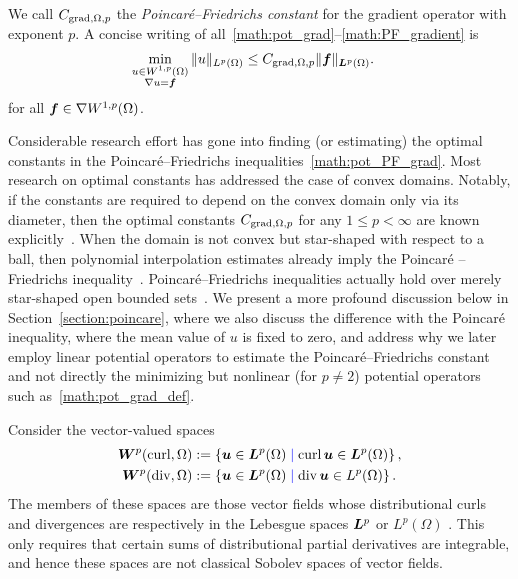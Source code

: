\documentclass[10pt,a4paper]{article}
\newcommand\cye[1]{%
\protect\leavevmode
\begingroup
    \color{blue}%
    #1%
\endgroup
}
\begin{document}
We call $C_{\operatorname{grad},\Omega,p}$ the \emph{Poincar\'e--Friedrichs constant} for the gradient operator with exponent $p$. \cye{A concise writing of all~\eqref{math:pot_grad}--\eqref{math:PF_gradient} is
\begin{align} \label{math:pot_PF_grad}
    \min\limits_{ \substack{ u \in W^{1,p}(\Omega) \\ \nabla u = \bm{f} } } 
    \| u \|_{L^{p}(\Omega)}
    &\leq 
    C_{\operatorname{grad},\Omega,p}
    \| \bm{f} \|_{\bm{L}^{p}(\Omega)}.
\end{align}
for all $\bm{f} \in \nabla W^{1,p}(\Omega)$.}

Considerable research effort has gone into finding (or estimating) the optimal constants in the Poincar\'e--Friedrichs inequalities~\eqref{math:pot_PF_grad}. Most research on optimal constants has addressed the case of convex domains. 
Notably, if the constants are required to depend on the convex domain only via its diameter, 
then the optimal constants $C_{\operatorname{grad},\Omega,p}$ for any $1 \leq p < \infty$ are known explicitly~\cite{Pay_Wei_Poin_conv_60,bebendorf2003note,acosta2004optimal,esposito2013poincare,ferone2012remark}.
When the domain is not convex but star-shaped with respect to a ball,
then polynomial interpolation estimates already imply the Poincar\'e\cye{--Friedrichs} inequality~\cite{brenner2008mathematical,ern2021finite}. 
Poincar\'e--Friedrichs inequalities actually hold over merely star-shaped open bounded sets~\cite[Theorem~3.1]{hurri1988poincare}. 
\cye{We present a more profound discussion below in Section~\ref{section:poincare}, where we also discuss the difference with the Poincar\'e inequality, where the mean value of $u$ is fixed to zero, and address why we later employ linear potential operators to estimate the Poincar\'e--Friedrichs constant and not directly the minimizing but nonlinear (for $p \neq 2$) potential operators such as~\eqref{math:pot_grad_def}.} 


Consider the vector-valued spaces
\begin{subequations}\label{equation:W_curl_div_p} \begin{align}
    \bfW^{p}(\curl,\Omega) &:= \left\{ \bfu \in \bfL^{p}(\Omega) \cye{\suchthat} \curl \bfu \in \bfL^{p}(\Omega) \right\}
    ,
    \\
    \bfW^{p}(\divergence,\Omega) &:= \left\{ \bfu \in \bfL^{p}(\Omega) \cye{\suchthat} \divergence \bfu \in L^{p}(\Omega) \right\}
    .
\end{align}\end{subequations}
The members of these spaces are those vector fields whose distributional curls and divergences are \cye{respectively} in \cye{the} Lebesgue spaces \cye{$\bm{L}^{p}$ or $L^{p}(\Omega)$}.  
This only requires that certain sums of distributional partial derivatives are integrable, 
and hence these spaces are not classical Sobolev spaces of vector  fields. 
\end{document}
